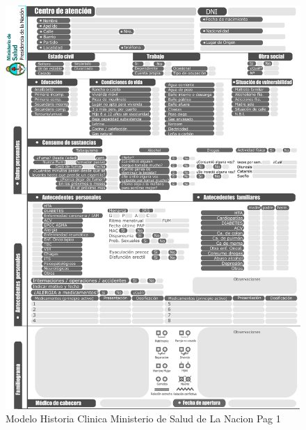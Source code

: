 \begin{figure}[H]
    \centering
    \includegraphics[scale=0.7]{resourse/historia-clinica-f.jpg}
    \caption{Modelo Historia Clinica Ministerio de Salud de La Nacion Pag 1}
    \label{fig:06}
\end{figure}  


